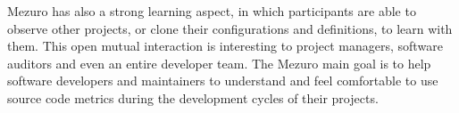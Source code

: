 Mezuro has also a strong learning aspect, in which participants are able to
observe other projects, or clone their configurations and definitions, to learn
with them.  This open mutual interaction is interesting to project managers,
software auditors and even an entire developer team. The Mezuro main goal is to
help software developers and maintainers to understand and feel comfortable to
use source code metrics during the development cycles of their projects.

